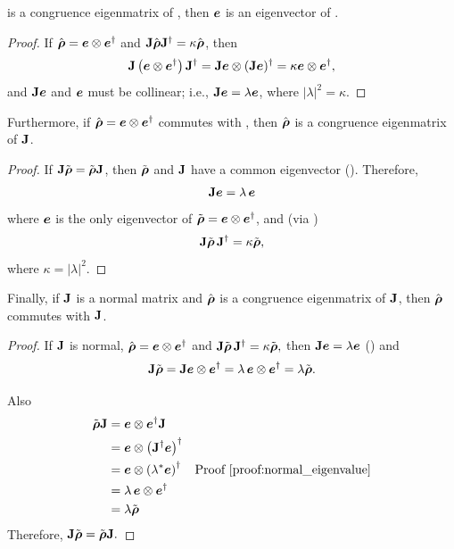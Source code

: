 %
is a congruence eigenmatrix of , then $\mbox{\boldmath $e$}$
is an eigenvector of .
%
\begin{proof}
%
\label{proof:eigenmatrix_to_eigenvector}
%
If $\hat{\mbox{\boldmath $\rho$}}=\mbox{\boldmath $e$} \otimes \mbox{\boldmath $e$}^\dagger$ and ${\bf J}\hat{\mbox{\boldmath $\rho$}}{\bf J}^\dagger = \kappa \hat{\mbox{\boldmath $\rho$}}$, then
%
$$ {\bf J} \left( \mbox{\boldmath $e$} \otimes \mbox{\boldmath $e$}^\dagger \right) {\bf J}^\dagger
=
{\bf J} \mbox{\boldmath $e$} \otimes  ({\bf J}\mbox{\boldmath $e$})^\dagger 
=
\kappa \mbox{\boldmath $e$} \otimes \mbox{\boldmath $e$}^\dagger, $$
and ${\bf J} \mbox{\boldmath $e$}$ and $\mbox{\boldmath $e$}$ must be collinear; i.e.,
${\bf J} \mbox{\boldmath $e$} = \lambda \mbox{\boldmath $e$}$, where $|\lambda|^2 = \kappa$.
\end{proof}
%
\noindent
Furthermore, if
%
$\hat{\mbox{\boldmath $\rho$}}=\mbox{\boldmath $e$} \otimes \mbox{\boldmath $e$}^\dagger$ 
%
commutes with , then $\hat{\mbox{\boldmath $\rho$}}$
is a congruence eigenmatrix of ${\bf J}$.
%
\begin{proof}
\label{proof:if_commutes_then_eigen}
If ${\bf J} \tilde{\mbox{\boldmath $\rho$}} = \tilde{\mbox{\boldmath $\rho$}} {\bf J}$, then 
$\tilde{\mbox{\boldmath $\rho$}}$ and ${\bf J}$ have a common eigenvector ().
Therefore,
$${\bf J} \mbox{\boldmath $e$} = \lambda \, \mbox{\boldmath $e$}$$
%
where $\mbox{\boldmath $e$}$ is the only eigenvector of $\tilde{\mbox{\boldmath $\rho$}}=\mbox{\boldmath $e$} \otimes \mbox{\boldmath $e$}^\dagger$, and
%
(via )
%
$${\bf J} \tilde{\mbox{\boldmath $\rho$}}\, {\bf J}^\dagger = \kappa\tilde{\mbox{\boldmath $\rho$}},$$
where $\kappa=|\lambda|^2$.
\end{proof}
%

\noindent
Finally, if 
${\bf J}$ is a normal matrix
and 
$\hat{\mbox{\boldmath $\rho$}}$ is a congruence eigenmatrix of ${\bf J}$,
then 
$\hat{\mbox{\boldmath $\rho$}}$ commutes with ${\bf J}$.

\begin{proof}
\label{proof:if_eigen_then_commutes}
If ${\bf J}$ is normal,
$\hat{\mbox{\boldmath $\rho$}}=\mbox{\boldmath $e$} \otimes \mbox{\boldmath $e$}^\dagger$ 
and
${\bf J} \tilde{\mbox{\boldmath $\rho$}}\, {\bf J}^\dagger = \kappa\tilde{\mbox{\boldmath $\rho$}},$
then 
${\bf J} \mbox{\boldmath $e$} = \lambda \mbox{\boldmath $e$}$ ()
and
$${\bf J} \tilde{\mbox{\boldmath $\rho$}} 
  = {\bf J} \mbox{\boldmath $e$} \otimes \mbox{\boldmath $e$}^\dagger 
  = \lambda \, \mbox{\boldmath $e$} \otimes \mbox{\boldmath $e$}^\dagger 
  = \lambda \tilde{\mbox{\boldmath $\rho$}}. $$

Also
\begin{align*}
 \tilde{\cohM{\rho}} \JM{J}
  &=  \Jcol{e} \otimes \Jcol{e}^\dagger \JM{J} \\
  &= \Jcol{e} \otimes \left( \JM{J}^\dagger \Jcol{e} \right)^\dagger  \\
  &= \Jcol{e} \otimes \left( \lambda^* \Jcol{e} \right)^\dagger & \text{\Proof{normal_eigenvalue}} \\
  &= \lambda \, \Jcol{e} \otimes  \Jcol{e}^\dagger \\
  &= \lambda \tilde{\cohM{\rho}}
\end{align*}
Therefore, ${\bf J} \tilde{\mbox{\boldmath $\rho$}} = \tilde{\mbox{\boldmath $\rho$}} {\bf J}.$
\end{proof}

